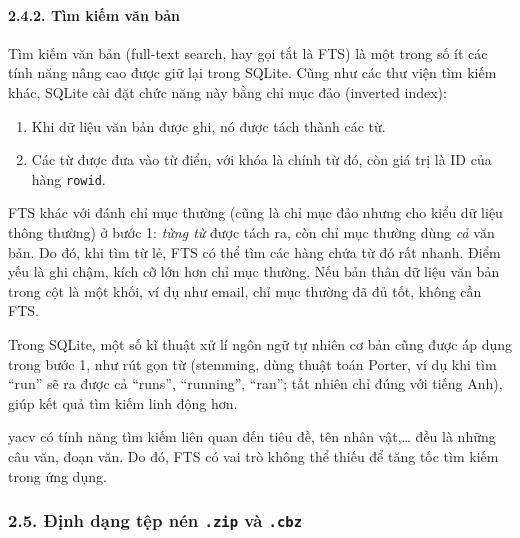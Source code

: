 \hypertarget{tuxecm-kiux1ebfm-vux103n-bux1ea3n}{%
  \paragraph{\texorpdfstring{2.4.2. Tìm kiếm văn bản
    }{2.4.2. Tìm kiếm văn bản }}\label{tuxecm-kiux1ebfm-vux103n-bux1ea3n}}

Tìm kiếm văn bản (full-text search, hay gọi tắt là FTS) là một trong số
ít các tính năng nâng cao được giữ lại trong SQLite. Cũng như các thư
viện tìm kiếm khác, SQLite cài đặt chức năng này bằng chỉ mục đảo
(inverted index):

\begin{enumerate}
  \def\labelenumi{\arabic{enumi}.}
  
  \item
        Khi dữ liệu văn bản được ghi, nó được tách thành các từ.
  \item
        Các từ được đưa vào từ điển, với khóa là chính từ đó, còn giá trị là
        ID của hàng \texttt{rowid}.
\end{enumerate}

FTS khác với đánh chỉ mục thường (cũng là chỉ mục đảo nhưng cho kiểu dữ
liệu thông thường) ở bước 1: \emph{từng từ} được tách ra, còn chỉ mục
thường dùng \emph{cả} văn bản. Do đó, khi tìm từ lẻ, FTS có thể tìm các
hàng chứa từ đó rất nhanh. Điểm yếu là ghi chậm, kích cỡ lớn hơn chỉ mục
thường. Nếu bản thân dữ liệu văn bản trong cột là một khối, ví dụ như
email, chỉ mục thường đã đủ tốt, không cần FTS.

Trong SQLite, một số kĩ thuật xử lí ngôn ngữ tự nhiên cơ bản cũng được
áp dụng trong bước 1, như rút gọn từ (stemming, dùng thuật toán Porter,
ví dụ khi tìm ``run'' sẽ ra được cả ``runs'', ``running'', ``ran''; tất
nhiên chỉ đúng với tiếng Anh), giúp kết quả tìm kiếm linh động hơn.

yacv có tính năng tìm kiếm liên quan đến tiêu đề, tên nhân vật,\ldots{}
đều là những câu văn, đoạn văn. Do đó, FTS có vai trò không thể thiếu để
tăng tốc tìm kiếm trong ứng dụng.

\hypertarget{ux111ux1ecbnh-dux1ea1ng-tux1ec7p-nuxe9n-.zip-vuxe0-.cbz}{%
  \subsubsection{\texorpdfstring{2.5. Định dạng tệp nén \texttt{.zip} và \texttt{.cbz}
    }{2.5. Định dạng tệp nén .zip và .cbz }}\label{ux111ux1ecbnh-dux1ea1ng-tux1ec7p-nuxe9n-.zip-vuxe0-.cbz}}

